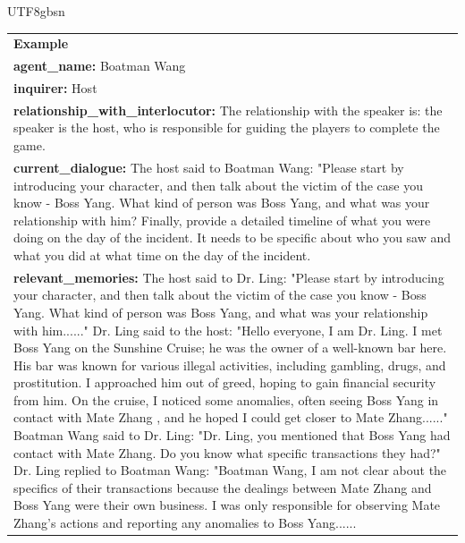 \documentclass[11pt]{article}
\begin{document}
{\begin{CJK}{UTF8}{gbsn}
\begin{table}[ht!]
\begin{tabular}{|m{16cm}|}
\rowcolor{lightgray}  \textbf{Example}  \\
 \textbf{   agent\_name:} \small Boatman Wang\\
\textbf{   inquirer:} \small Host\\
\textbf{   relationship\_with\_interlocutor:} \small The relationship with the speaker is: the speaker is the host, who is responsible for guiding the players to complete the game. \\
\textbf{   current\_dialogue:} \small The host said to Boatman Wang: "Please start by introducing your character, and then talk about the victim of the case you know - Boss Yang. What kind of person was Boss Yang, and what was your relationship with him? Finally, provide a detailed timeline of what you were doing on the day of the incident. It needs to be specific about who you saw and what you did at what time on the day of the incident. \\

\textbf{   relevant\_memories:} \small The host said to Dr. Ling: "Please start by introducing your character, and then talk about the victim 
of the case you know - Boss Yang. What kind of person was Boss Yang, and what was your relationship with
him......" Dr. Ling said to the host: "Hello everyone, I am Dr. Ling. I met Boss Yang on the
Sunshine Cruise; he was the owner of a well-known bar here. His bar was known for various illegal 
activities, including gambling, drugs, and prostitution. I approached him out of greed, hoping 
to gain financial security from him. On the cruise, I noticed some anomalies, often seeing
Boss Yang in contact with Mate Zhang , and he hoped I could get closer to Mate 
Zhang......" Boatman Wang said to Dr. Ling: "Dr. Ling, you mentioned that Boss Yang 
had contact with Mate Zhang. Do you know what specific transactions they had?" Dr. Ling 
replied to Boatman Wang: "Boatman Wang, I am not clear about the specifics of their transactions 
because the dealings between Mate Zhang and Boss Yang were their own business. I was only 
responsible for observing Mate Zhang's actions and reporting any anomalies to Boss Yang......\\


\end{tabular}
\end{table}
\end{CJK}}
\end{document}
